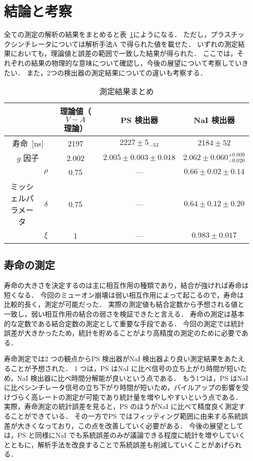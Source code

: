 \section{結論と考察}
全ての測定の解析の結果をまとめると表~\ref{tab:result_conclusion}にようになる．
ただし，プラスチックシンチレータについては解析手法A で得られた値を載せた．
いずれの測定結果においても，理論値と誤差の範囲で一致した結果が得られた．
ここでは，それぞれの結果の物理的な意味について確認し，今後の展望について考察していきたい．
また，2つの検出器の測定結果についての違いも考察する．

\begin{table}[h]
\centering
\caption{測定結果まとめ}
\label{tab:result_conclusion}
\begin{tabular}{ccccc}\toprule
{} & {} & 理論値（$V-A$理論） & PS 検出器 & NaI 検出器\\ \midrule
\multicolumn{2}{c}{寿命~[ns]} &  2197 & $2227 \pm 5_{- 53}$ & $2184 \pm 52$\\
\multicolumn{2}{c}{$g$ 因子} & 2.002 & $2.005 \pm 0.003 \pm 0.018$ & $2.062 \pm 0.060^{+0.009}_{-0.020}$\\ 
{} & $\rho$ & 0.75 & --- & $0.66 \pm 0.02 \pm 0.14$\\
ミッシェルパラメータ & $\delta$ & 0.75 & --- & $0.64 \pm 0.12 \pm 0.20$\\
{} & $\xi$ & 1 & --- & $0.983 \pm 0.017$\\ \bottomrule
\end{tabular}
\end{table}%

\subsection{寿命の測定}
寿命の大きさを決定するのは主に相互作用の種類であり，結合が強ければ寿命は短くなる．
今回のミューオン崩壊は弱い相互作用によって起こるので，寿命は比較的長く，測定が可能だった．
実際の測定値も結合定数から予想される値と一致し，弱い相互作用の結合の弱さを検証できたと言える．
寿命の測定は基本的な定数である結合定数の測定として重要な手段である．
今回の測定では統計誤差が大きかったため，統計を貯めることがより高精度の測定のために必要である．

寿命測定では2 つの観点からPS 検出器がNaI 検出器より良い測定結果をあたえることが予想された．
1 つは，PS はNaI に比べ信号の立ち上がり時間が短いため，NaI 検出器に比べ時間分解能が良いという点である．
もう1つは，PS はNaI に比べシンチレータ信号の立ち下がり時間が短いため，パイルアップの影響を受けづらく高レートの測定が可能であり統計量を増やしやすいという点である．
実際，寿命測定の統計誤差を見ると，PS のほうがNaI に比べて精度良く測定することができている．
その一方でPS ではフィッティング範囲に由来する系統誤差が大きくなっており，この点を改善していく必要がある．
今後の展望としては，PS と同様にNaI でも系統誤差のみが議論できる程度に統計を増やしていくとともに，解析手法を改良することで系統誤差も削減していくことがあげられる．%

